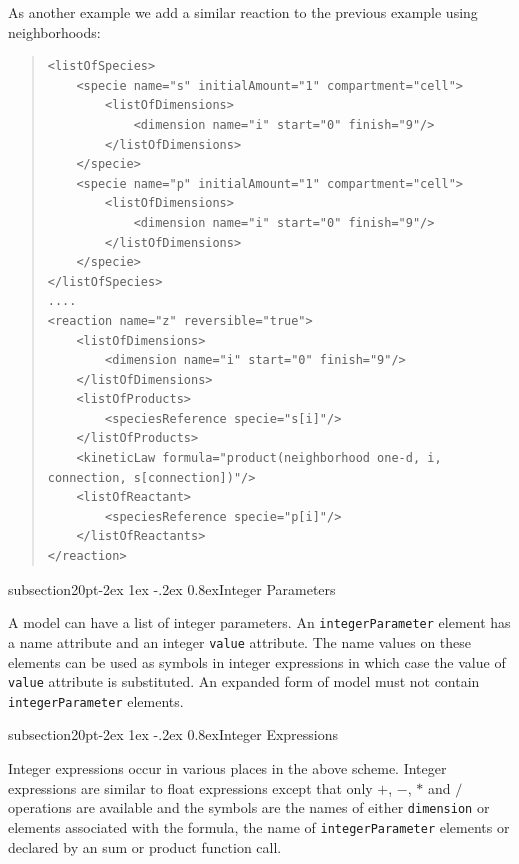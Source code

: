 \documentclass[10pt]{article}
\makeatletter
\renewcommand{\subsection}{\@startsection%
  {subsection}{2}{0pt}{-2ex \@plus 1ex \@minus -.2ex}%
  {0.8ex}{\slshape\large\bfseries\sffamily}}
\newcommand{\tightspacing}{\renewcommand{\baselinestretch}{0.85}}
\newcommand{\regularspacing}{\renewcommand{\baselinestretch}{1.0}}
\newcommand{\class}[1]{\texttt{#1}}
\newcommand{\attrib}[1]{\texttt{#1}}
\makeatother
\begin{document}
As another example we add a similar reaction to the previous example using neighborhoods:

\begin{quote}
  \begin{small}
    \tightspacing
\begin{verbatim}
<listOfSpecies>
    <specie name="s" initialAmount="1" compartment="cell">
        <listOfDimensions>
            <dimension name="i" start="0" finish="9"/>
        </listOfDimensions>
    </specie>
    <specie name="p" initialAmount="1" compartment="cell">
        <listOfDimensions>
            <dimension name="i" start="0" finish="9"/>
        </listOfDimensions>
    </specie>
</listOfSpecies>
....
<reaction name="z" reversible="true">
    <listOfDimensions>
        <dimension name="i" start="0" finish="9"/>
    </listOfDimensions>
    <listOfProducts>
        <speciesReference specie="s[i]"/>
    </listOfProducts>
    <kineticLaw formula="product(neighborhood one-d, i, connection, s[connection])"/>
    <listOfReactant>
        <speciesReference specie="p[i]"/>
    </listOfReactants>
</reaction>

\end{verbatim}
    \regularspacing
  \end{small}
\end{quote}

\subsection{Integer Parameters}

A model can have a list of integer parameters.
An \class{integerParameter} element has a name attribute and an
integer \attrib{value} attribute. The name values on these
elements can be used as symbols in integer expressions in which
case the value of \attrib{value} attribute is substituted.  An
expanded form of model must not contain \class{integerParameter}
elements.

\subsection{Integer Expressions}

Integer expressions occur in various places in the above scheme.
Integer expressions are similar to float expressions except that
only $+$, $-$, $*$ and $/$ operations are available and the
symbols are the names of either \class{dimension} or
 elements associated with the formula, the name of
\class{integerParameter} elements or declared by an sum or product
function call.
\end{document}

